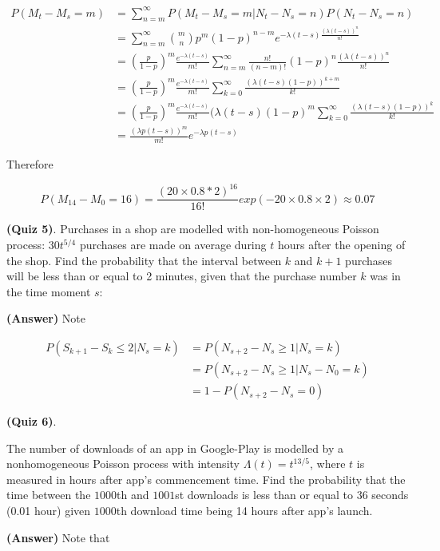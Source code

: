 \documentclass[12pt]{article}
\theoremstyle{nonumberbreak}
\begin{document}
$$
\begin{aligned}
P(M_t - M_s = m) &= \sum_{n=m}^\infty P(M_t - M_s = m | N_t - N_s = n ) P (N_t - N_s = n)\\[8pt]
&= \sum_{n=m}^\infty \binom{m}{n} p^m (1-p)^{n-m} e^{-\lambda(t-s) \frac{(\lambda(t-s))^n}{n!}} \\[8pt]
&= (\frac{p}{1-p})^m \frac{e^{-\lambda (t-s)}}{m!}\sum_{n=m}^\infty \frac{n!}{(n-m)!} (1-p)^n \frac{(\lambda(t-s))^n}{n!} \\[8pt]
&= (\frac{p}{1-p})^m \frac{e^{-\lambda (t-s)}}{m!} \sum_{k=0}^\infty \frac{(\lambda (t-s) (1-p) )^{k+m}}{k!} \\[8pt]
&= (\frac{p}{1-p})^m \frac{e^{-\lambda (t-s)}}{m!} (\lambda (t-s) (1-p)^m \sum_{k=0}^\infty \frac{(\lambda (t-s) (1-p) )^k}{k!} \\[8pt]
&= \frac{(\lambda p (t-s))^m}{m!} e^{-\lambda p (t-s)}
\end{aligned}
$$

Therefore

$$
P (M_{14} - M_0 = 16) = \frac{(20\times 0.8 * 2)^{16}}{16!} exp(-20\times0.8\times2) \approx 0.07
$$



\textbf{(Quiz 5)}. Purchases in a shop are modelled with non-homogeneous Poisson process: $30t^{5/4}$ purchases are made on average during $t$ hours after the opening of the shop. Find the probability that the interval between $k$ and $k+1$ purchases will be less than or equal to 2 minutes, given that the purchase number $k$ was in the time moment $s$:

\textbf{(Answer)} Note


$$
\begin{aligned}
P(S_{k+1} - S_k \le 2 | N_s = k) &= P(N_{s+2} - N_s \ge 1| N_s = k) \\[8pt]
&= P(N_{s+2} - N_s \ge 1 | N_s - N_0 = k) \\[8pt]
&= 1 - P(N_{s+2} - N_s = 0)
\end{aligned}
$$


\textbf{(Quiz 6)}. 

The number of downloads of an app in Google-Play is modelled by a nonhomogeneous Poisson process with intensity $\Lambda(t)=t^{13/5}$, where $t$ is measured in hours after app's commencement time. Find the probability that the time between the $1000$th and $1001$st downloads is less than or equal to $36$ seconds (0.01 hour) given $1000$th download time being 14 hours after app's launch.


\textbf{(Answer)} Note that
\end{document}
